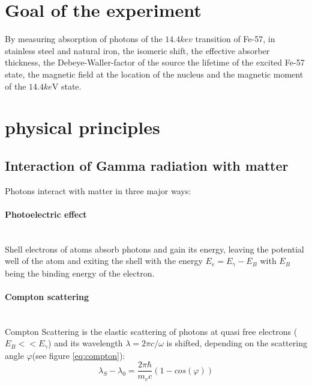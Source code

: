 \section{Goal of the experiment}
By measuring absorption of photons of the $14.4 kev$ transition of Fe-57, in stainless steel and natural iron, the isomeric shift, the effective absorber thickness, the  Debeye-Waller-factor of the source the lifetime of the excited Fe-57 state, the magnetic field at the location of the nucleus and the magnetic moment of the $14.4 ke$V state.

\section{physical principles}
\subsection{Interaction of Gamma radiation with matter}
Photons interact with matter in three major ways\cite{Demtröder}:
\paragraph{Photoelectric effect} \ \\
Shell electrons of atoms absorb photons and gain its energy, leaving the potential well of the atom and exiting the shell with the energy $E_e = E_\gamma-E_B$ with $E_B$ being the binding energy of the electron.
\paragraph{Compton scattering} \ \\
Compton Scattering is the elastic scattering of photons at quasi free  electrons ($E_B << E_\gamma$) and its wavelength $\lambda=2\pi c/\omega$ is shifted, depending on the scattering angle $\varphi$(see figure \ref*{eq:compton}):
\begin{equation}
\lambda_S -\lambda_0 = \frac{2 \pi \hbar}{m_e c}(1-cos(\varphi))
\label{eq:compton}
\end{equation}
